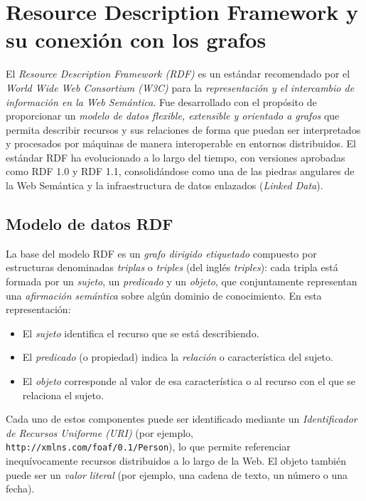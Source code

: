 \documentclass{article}
\begin{document}
\section{Resource Description Framework y su conexión con los grafos}

El \textit{Resource Description Framework (RDF)} es un estándar recomendado por el \textit{World Wide Web Consortium (W3C)} para la \textit{representación y el intercambio de información en la Web Semántica}. Fue desarrollado con el propósito de proporcionar un \textit{modelo de datos flexible, extensible y orientado a grafos} que permita describir recursos y sus relaciones de forma que puedan ser interpretados y procesados por máquinas de manera interoperable en entornos distribuidos. El estándar RDF ha evolucionado a lo largo del tiempo, con versiones aprobadas como RDF 1.0 y RDF 1.1, consolidándose como una de las piedras angulares de la Web Semántica y la infraestructura de datos enlazados (\textit{Linked Data}).

\subsection{Modelo de datos RDF}

La base del modelo RDF es un \textit{grafo dirigido etiquetado} compuesto por estructuras denominadas \textit{triplas} o \textit{triples} (del inglés \textit{triples}): cada tripla está formada por un \textit{sujeto}, un \textit{predicado} y un \textit{objeto}, que conjuntamente representan una \textit{afirmación semántica} sobre algún dominio de conocimiento. En esta representación:

\begin{itemize}
    \item El \textit{sujeto} identifica el recurso que se está describiendo.
    \item El \textit{predicado} (o propiedad) indica la \textit{relación} o característica del sujeto.
    \item El \textit{objeto} corresponde al valor de esa característica o al recurso con el que se relaciona el sujeto.
\end{itemize}

Cada uno de estos componentes puede ser identificado mediante un \textit{Identificador de Recursos Uniforme (URI)} (por ejemplo, \texttt{http://xmlns.com/foaf/0.1/Person}), lo que permite referenciar inequívocamente recursos distribuidos a lo largo de la Web. El objeto también puede ser un \textit{valor literal} (por ejemplo, una cadena de texto, un número o una fecha).
\end{document}
